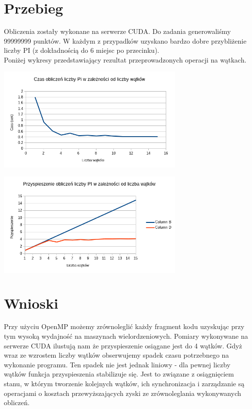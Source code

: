 \documentclass[a4paper,12pt]{article}
\begin{document}
\section*{Przebieg}
Obliczenia zostały wykonane na serwerze CUDA. Do zadania generowaliśmy 99999999 punktów. W każdym z przypadków uzyskano bardzo dobre przybliżenie liczby PI (z dokładnością do 6 miejsc po przecinku).\\



Poniżej wykresy przedstawiający rezultat przeprowadzonych operacji na wątkach.
\\
\begin{center}
\includegraphics[width=0.7\textwidth]{data/przysp.png}
\end{center}


\begin{center}
\includegraphics[width=0.7\textwidth]{data/speedup.png}
\end{center}


\section*{Wnioski}
Przy użyciu OpenMP możemy zrównoleglić każdy fragment kodu uzyskując przy tym wysoką wydajność na maszynach wielordzeniowych. Pomiary wykonywane na serwerze CUDA ilustują nam że przyspieszenie osiągane jest do 4 wątków. Gdyż wraz ze wzrostem liczby wątków obserwujemy spadek czasu potrzebnego na wykonanie programu. Ten spadek nie jest jednak liniowy - dla pewnej liczby wątków funkcja przyspieszenia stabilizuje się. Jest to związane z osiągnięciem stanu, w którym tworzenie kolejnych wątków, ich synchronizacja i zarządzanie są operacjami o kosztach przewyższających zyski ze zrównoleglania wykonywanych obliczeń.
\end{document}
